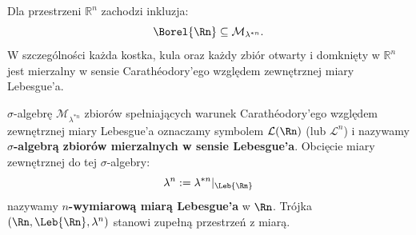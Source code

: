 \begin{wn} Dla przestrzeni $\mathbb{R}^n$ zachodzi inkluzja:
    \begin{equation*}
        \Borel{\Rn} \subseteq \mathcal{M}_{\lambda^{*n}}.
    \end{equation*}
    W szczególności każda kostka, kula oraz każdy zbiór otwarty i domknięty w $\mathbb{R}^n$ jest mierzalny w sensie Carathéodory'ego względem zewnętrznej miary Lebesgue'a.
\end{wn}
\begin{defi}
    $\sigma$-algebrę $\mathcal{M}_{\lambda^{*n}}$ zbiorów spełniających warunek Carathéodory'ego względem zewnętrznej miary Lebesgue'a oznaczamy symbolem $\mathcal{L}(\Rn)$ (lub $\mathcal{L}^n$) i nazywamy \textbf{$\sigma$-algebrą zbiorów mierzalnych w sensie Lebesgue'a}. Obcięcie miary zewnętrznej do tej $\sigma$-algebry:
    \begin{equation*}
        \lambda^n := \lambda^{*n}|_{\Leb{\Rn}}
    \end{equation*}
    nazywamy \textbf{$n$-wymiarową miarą Lebesgue'a} w $\Rn$. Trójka $(\Rn, \Leb{\Rn}, \lambda^n)$ stanowi zupełną przestrzeń z miarą.
\end{defi}
